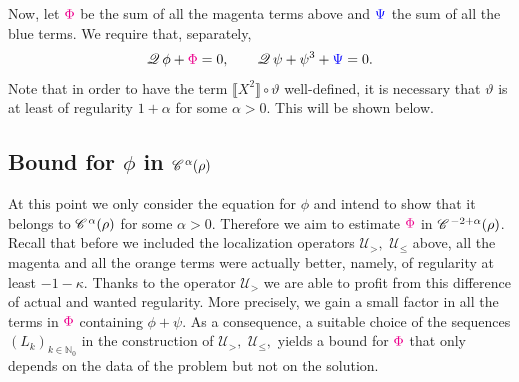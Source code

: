 \documentclass[a4paper,11pt]{article}
\numberwithin{equation}{section}
\newcommand{\CC}{\mathscr{C} \hspace{.1em}}
\newcommand{\UU}{\mathscr{U}}
\newcommand{\Q}{\mathscr{Q} \hspace{.2em}}
\newcommand{\rmb}[1]{\textcolor{blue}{#1}}
\newcommand{\rmm}[1]{\textcolor{magenta}{#1}}
\newcommand{\8}{\infty}
\begin{document}
Now, let $\rmm{\Phi}$ be the sum of all the  magenta terms above and $\rmb{\Psi}$ the sum of all the blue terms. We require that, separately,
\begin{align}\label{eq:two}
 \Q \phi + \rmm{\Phi} = 0, \qquad \Q \psi + \psi^3 + \rmb{\Psi} = 0. 
 \end{align}
Note that in order to have the term $\llbracket X^2\rrbracket\circ\vartheta$ well-defined, it is necessary that $\vartheta$ is at least of regularity $1+\alpha$ for some $\alpha>0.$  This will be shown below. 




\subsection{Bound for $\phi$ in $\CC^\alpha(\rho)$}
\label{ssec:phi1}

At this point we only consider the equation for $\phi$ and intend to show that it belongs to $\CC^{\alpha}(\rho)$ for some $\alpha>0$.
Therefore we aim to estimate $\rmm{\Phi}$ in $\CC^{-2+\alpha}(\rho)$. Recall that before we included the localization operators $\UU_>,$ $\UU_\leqslant$ above, all the magenta and all the orange terms were actually better, namely, of regularity at least $-1-\kappa$. Thanks to the operator $\UU_>$ we are able to profit from this difference of actual and wanted regularity. More precisely, we gain a small factor in all the terms in $\rmm{\Phi}$ containing $\phi+\psi$. As a consequence, a suitable choice of the sequences $(L_k)_{k\in\mathbb{N}_0}$ in the construction of $\UU_>,$ $\UU_\leqslant,$ yields  a bound for $\rmm{\Phi}$ that only depends on the data of the problem but not on the solution. 
\end{document}
